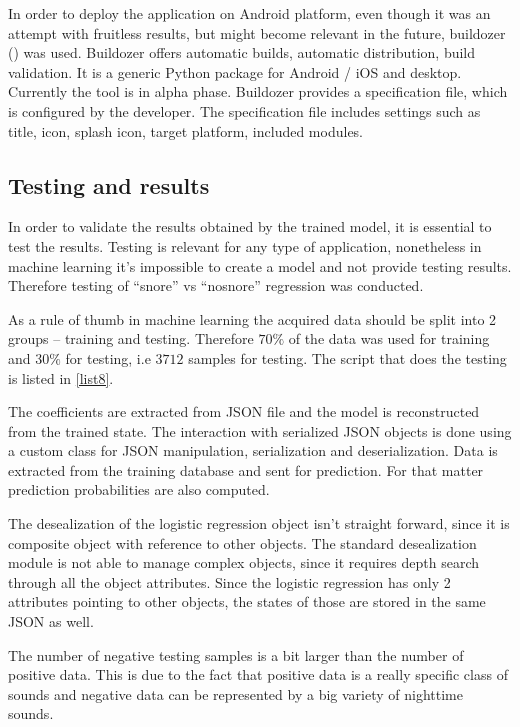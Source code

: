 In order to deploy the application on Android platform, even though it was an attempt with fruitless results, but might become relevant in the future, buildozer (\cite{buildozer}) was used. Buildozer offers automatic builds, automatic distribution, build validation. It is a generic Python package for Android / iOS and desktop. Currently the tool is in alpha phase. Buildozer provides a specification file, which is configured by the developer. The specification file includes settings such as title, icon, splash icon, target platform, included modules. 

\subsection{Testing and results}

In order to validate the results obtained by the trained model, it is essential to test the results. Testing is relevant for any type of application, nonetheless in machine learning it's impossible to create a model and not provide testing results. Therefore testing of ``snore'' vs ``nosnore'' regression was conducted.

As a rule of thumb in machine learning the acquired data should be split into 2 groups -- training and testing. Therefore $70\%$ of the data was used for training and $30\%$ for testing, i.e $3712$ samples for testing. The script that does the testing is listed in \ref{list8}. 

The coefficients are extracted from JSON file and the model is reconstructed from the trained state. The interaction with serialized JSON objects is done using a custom class for JSON manipulation, serialization and deserialization. Data is extracted from the training database and sent for prediction. For that matter prediction probabilities are also computed.

The desealization of the logistic regression object isn't straight forward, since it is composite object with reference to other objects. The standard desealization module is not able to manage complex objects, since it requires depth search through all the object attributes. Since the logistic regression has only 2 attributes pointing to other objects, the states of those are stored in the same JSON as well.

The number of negative testing samples is a bit larger than the number of positive data. This is due to the fact that positive data is a really specific class of sounds and negative data can be represented by a big variety of nighttime sounds.

